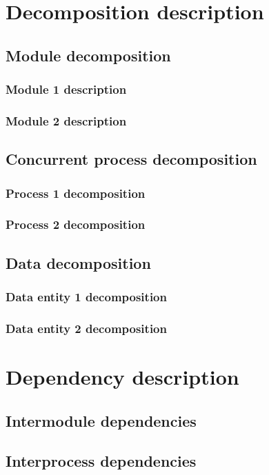 \documentclass[12pt]{article}
\begin{document}
\section{Decomposition description}
\subsection{Module decomposition}
\subsubsection{Module 1 description}
\subsubsection{Module 2 description}

\subsection{Concurrent process decomposition}
\subsubsection{Process 1 decomposition}
\subsubsection{Process 2 decomposition}

\subsection{Data decomposition}
\subsubsection{Data entity 1 decomposition}
\subsubsection{Data entity 2 decomposition}

\section{Dependency description}
\subsection{Intermodule dependencies}
\subsection{Interprocess dependencies}
\end{document}
